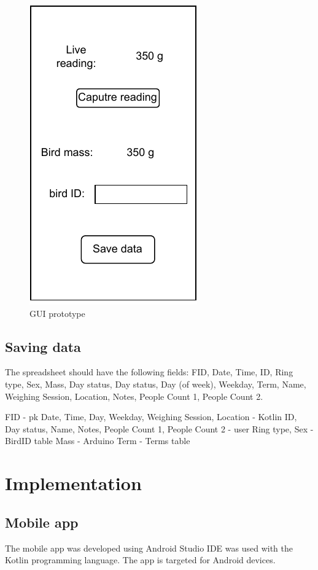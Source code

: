 \documentclass[class=report,11pt,crop=false]{standalone}
\begin{document}
		\begin{figure}[h!]
			\centering
			\includegraphics[scale=1]{"Figures/GUI prototype"}
			\caption{GUI prototype}
			\label{fig:gui-prototype}
		\end{figure}
		
		\subsection{Saving data}
		
		
		The spreadsheet should have the following fields: FID, Date, Time, ID, Ring type, Sex, Mass, Day status, Day status, Day (of week), Weekday, Term, Name, Weighing Session, Location, Notes, People Count 1, People Count 2.
		
		FID - pk
		Date, Time, Day, Weekday, Weighing Session, Location - Kotlin
		ID, Day status, Name, Notes, People Count 1, People Count 2 - user
		Ring type, Sex - BirdID table
		Mass - Arduino
		Term - Terms table
		
	
	\section{Implementation}
		\subsection{Mobile app}
		The mobile app was developed using Android Studio IDE was used with the Kotlin programming language. The app is targeted for Android devices. 
	
\end{document}
